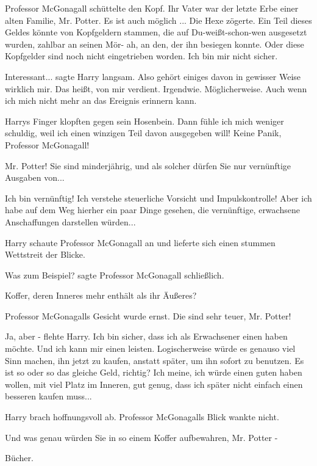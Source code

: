 Professor McGonagall schüttelte den Kopf. \glqq{}Ihr Vater war der letzte Erbe
einer alten Familie, Mr. Potter. Es ist auch möglich ...\grqq{} Die Hexe
zögerte. \glqq{}Ein Teil dieses Geldes könnte von Kopfgeldern stammen, die auf
Du-weißt-schon-wen ausgesetzt wurden, zahlbar an seinen Mör- ah, an den, der ihn
besiegen konnte. Oder diese Kopfgelder sind noch nicht eingetrieben worden. Ich
bin mir nicht sicher.\grqq{}

\glqq{}Interessant...\grqq{} sagte Harry langsam. \glqq{}Also gehört einiges davon
in gewisser Weise wirklich mir. Das heißt, von mir verdient. Irgendwie.
Möglicherweise. Auch wenn ich mich nicht mehr an das Ereignis erinnern
kann.\grqq{}

Harrys Finger klopften gegen sein Hosenbein. \glqq{}Dann fühle ich mich weniger
schuldig, weil ich einen winzigen Teil davon ausgegeben will! Keine Panik,
Professor McGonagall!\grqq{}

\glqq{}Mr. Potter! Sie sind minderjährig, und als solcher dürfen Sie nur
vernünftige Ausgaben von...\grqq{}

\glqq{}Ich bin vernünftig! Ich verstehe steuerliche Vorsicht und Impulskontrolle!
Aber ich habe auf dem Weg hierher ein paar Dinge gesehen, die vernünftige,
erwachsene Anschaffungen darstellen würden...\grqq{}

Harry schaute Professor McGonagall an und lieferte sich einen stummen Wettstreit
der Blicke.

\glqq{}Was zum Beispiel?\grqq{} sagte Professor McGonagall schließlich.

\glqq{}Koffer, deren Inneres mehr enthält als ihr Äußeres?\grqq{}

Professor McGonagalls Gesicht wurde ernst. \glqq{}Die sind sehr teuer, Mr.
Potter!\grqq{}

\glqq{}Ja, aber -\grqq{} flehte Harry. \glqq{}Ich bin sicher, dass ich als
Erwachsener einen haben möchte. Und ich kann mir einen leisten. Logischerweise
würde es genauso viel Sinn machen, ihn jetzt zu kaufen, anstatt später, um ihn
sofort zu benutzen. Es ist so oder so das gleiche Geld, richtig? Ich meine, ich
würde einen guten haben wollen, mit viel Platz im Inneren, gut genug, dass ich
später nicht einfach einen besseren kaufen muss...\grqq{}

Harry brach hoffnungsvoll ab. Professor McGonagalls Blick wankte nicht.

\glqq{}Und was genau würden Sie in so einem Koffer aufbewahren, Mr. Potter
-\grqq{}

\glqq{}Bücher.\grqq{}

